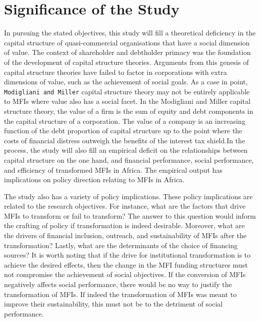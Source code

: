 \documentclass[a4paper,nobind]{templates/ociamthesis}
\begin{document}
\hypertarget{significance-of-the-study}{%
\section{Significance of the Study}\label{significance-of-the-study}}

\noindent In pursuing the stated objectives, this study will fill a theoretical deficiency in the capital structure of quasi-commercial organisations that have a social dimension of value. The context of shareholder and debtholder primacy was the foundation of the development of capital structure theories. Arguments from this genesis of capital structure theories have failed to factor in corporations with extra dimensions of value, such as the achievement of social goals. As a case in point, \texttt{Modigliani\ and\ Miller} capital structure theory may not be entirely applicable to MFIs where value also has a social facet. In the Modigliani and Miller capital structure theory, the value of a firm is the sum of equity and debt components in the capital structure of a corporation. The value of a company is an increasing function of the debt proportion of capital structure up to the point where the costs of financial distress outweigh the benefits of the interest tax shield.In the process, the study will also fill an empirical deficit on the relationships between capital structure on the one hand, and financial performance, social performance, and efficiency of transformed MFIs in Africa. The empirical output has implications on policy direction relating to MFIs in Africa.

The study also has a variety of policy implications. These policy implications are related to the research objectives. For instance, what are the factors that drive MFIs to transform or fail to transform? The answer to this question would inform the crafting of policy if transformation is indeed desirable. Moreover, what are the drivers of financial inclusion, outreach, and sustainability of MFIs after the transformation? Lastly, what are the determinants of the choice of financing sources? It is worth noting that if the drive for institutional transformation is to achieve the desired effects, then the change in the MFI funding structures must not compromise the achievement of social objectives. If the conversion of MFIs negatively affects social performance, there would be no way to justify the transformation of MFIs. If indeed the transformation of MFIs was meant to improve their sustainability, this must not be to the detriment of social performance.
\end{document}
